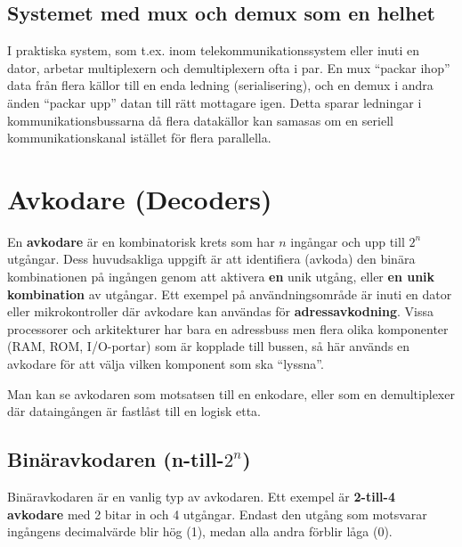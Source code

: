 \documentclass[
  swedish,
  letterpaper,
  oneside,
  openany]{book}
\begin{document}
\subsection{Systemet med mux och demux som en
helhet}\label{systemet-med-mux-och-demux-som-en-helhet}

I praktiska system, som t.ex. inom telekommunikationssystem eller inuti
en dator, arbetar multiplexern och demultiplexern ofta i par. En mux
``packar ihop'' data från flera källor till en enda ledning
(serialisering), och en demux i andra änden ``packar upp'' datan till
rätt mottagare igen. Detta sparar ledningar i kommunikationsbussarna då
flera datakällor kan samasas om en seriell kommunikationskanal istället
för flera parallella.

\section{Avkodare (Decoders)}\label{sec-avkodare}

En \textbf{avkodare} är en kombinatorisk krets som har \(n\) ingångar
och upp till \(2^n\) utgångar. Dess huvudsakliga uppgift är att
identifiera (avkoda) den binära kombinationen på ingången genom att
aktivera \textbf{en} unik utgång, eller \textbf{en unik kombination} av
utgångar. Ett exempel på användningsområde är inuti en dator eller
mikrokontroller där avkodare kan användas för \textbf{adressavkodning}.
Vissa processorer och arkitekturer har bara en adressbuss men flera
olika komponenter (RAM, ROM, I/O-portar) som är kopplade till bussen, så
här används en avkodare för att välja vilken komponent som ska
``lyssna''.

Man kan se avkodaren som motsatsen till en enkodare, eller som en
demultiplexer där dataingången är fastlåst till en logisk etta.

\subsection{\texorpdfstring{Binäravkodaren
(n-till-\(2^n\))}{Binäravkodaren (n-till-2\^{}n)}}\label{binuxe4ravkodaren-n-till-2n}

Binäravkodaren är en vanlig typ av avkodaren. Ett exempel är
\textbf{2-till-4 avkodare} med 2 bitar in och 4 utgångar. Endast den
utgång som motsvarar ingångens decimalvärde blir hög (1), medan alla
andra förblir låga (0).
\end{document}
